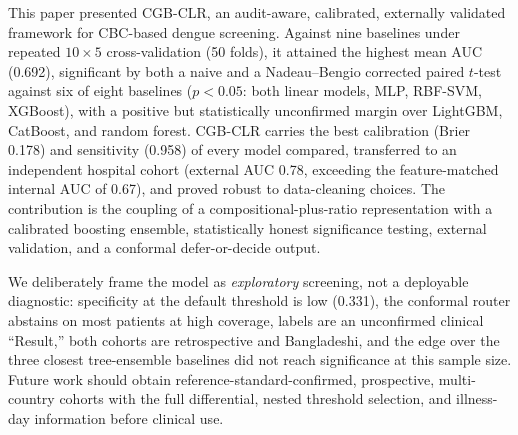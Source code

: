 \documentclass[conference]{IEEEtran}
\begin{document}
This paper presented CGB-CLR, an audit-aware, calibrated, externally validated
framework for CBC-based dengue screening. Against nine baselines under
repeated $10\times5$ cross-validation (50 folds), it attained the highest mean
AUC (0.692), significant by both a naive and a Nadeau--Bengio corrected paired
$t$-test against six of eight baselines ($p<0.05$: both linear models, MLP,
RBF-SVM, XGBoost), with a positive but statistically unconfirmed margin over
LightGBM, CatBoost, and random forest. CGB-CLR carries the best calibration
(Brier 0.178) and sensitivity (0.958) of every model compared, transferred to
an independent hospital cohort (external AUC 0.78, exceeding the
feature-matched internal AUC of 0.67), and proved robust to data-cleaning
choices. The contribution is the coupling of a compositional-plus-ratio
representation with a calibrated boosting ensemble, statistically honest
significance testing, external validation, and a conformal defer-or-decide
output.

We deliberately frame the model as \emph{exploratory} screening, not a
deployable diagnostic: specificity at the default threshold is low (0.331),
the conformal router abstains on most patients at high coverage, labels are an
unconfirmed clinical ``Result,'' both cohorts are retrospective and
Bangladeshi, and the edge over the three closest tree-ensemble baselines did
not reach significance at this sample size. Future work should obtain
reference-standard-confirmed, prospective, multi-country cohorts with the full
differential, nested threshold selection, and illness-day information before
clinical use.
\end{document}
